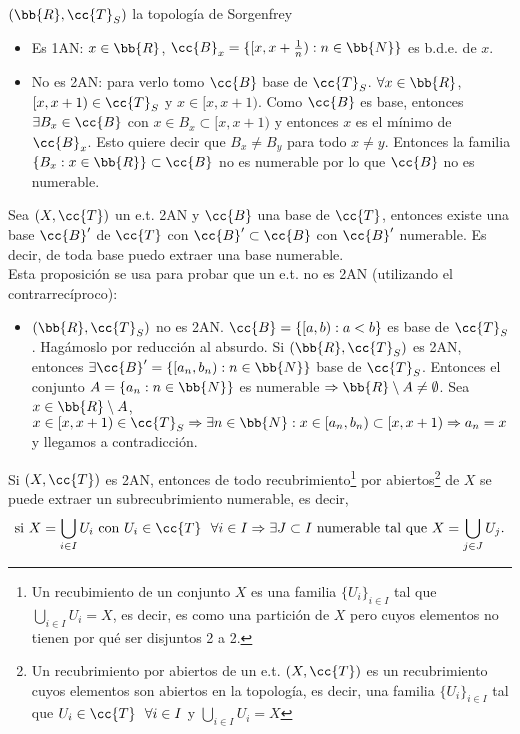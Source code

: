 \begin{ejemplo}
    $(\bb{R}, \cc{T}_S)$ la topología de Sorgenfrey
    \begin{itemize}
        \item Es 1AN: $x\in \bb{R}$, $\cc{B}_x = \{[x, x+\frac{1}{n}): n\in \bb{N}\}$ es b.d.e. de $x$.
        \item No es 2AN: para verlo tomo $\cc{B}$ base de $\cc{T}_S$. $\forall x \in \bb{R}$, $[x, x+1)\in \cc{T}_S$ y $x\in [x, x+1)$. Como $\cc{B}$ es base, entonces $\exists B_x \in \cc{B}$ con $x \in B_x \subset [x, x+1)$ y entonces $x$ es el mínimo de $\cc{B}_x$. Esto quiere decir que $B_x\neq B_y$ para todo $x\neq y$. Entonces la familia $\{B_x : x\in \bb{R}\}\subset \cc{B}$ no es numerable por lo que $\cc{B}$ no es numerable.
    \end{itemize}
\end{ejemplo}

\begin{prop}
    Sea $(X, \cc{T})$ un e.t. 2AN y $\cc{B}$ una base de $\cc{T}$, entonces existe una base $\cc{B}'$ de $\cc{T}$ con $\cc{B}'\subset \cc{B}$ con $\cc{B}'$ numerable. Es decir, de toda base puedo extraer una base numerable.\\

    Esta proposición se usa para probar que un e.t. no es 2AN (utilizando el contrarrecíproco):
    \begin{itemize}
        \item $(\bb{R}, \cc{T}_S)$ no es 2AN. $\cc{B}=\{[a,b):a<b\}$ es base de $\cc{T}_S$. Hagámoslo por reducción al absurdo. Si $(\bb{R}, \cc{T}_S)$ es 2AN, entonces $\exists \cc{B}'=\{[a_n, b_n): n \in \bb{N}\}$ base de $\cc{T}_S$. Entonces el conjunto $A=\{a_n : n\in \bb{N}\}$ es numerable $\Rightarrow \bb{R}\setminus A \neq \emptyset$. Sea $x \in \bb{R}\setminus A $, $x\in [x, x+1)\in \cc{T}_S \Rightarrow \exists n \in \bb{N}: x\in [a_n, b_n)\subset [x, x+1)\Rightarrow a_n=x$ y llegamos a contradicción.
    \end{itemize}
    \endsquare
\end{prop}

\begin{prop}
    Si $(X, \cc{T})$ es 2AN, entonces de todo recubrimiento\footnote{Un recubimiento de un conjunto $X$ es una familia $\{U_i\}_{i\in I}$ tal que $\bigcup\limits_{i\in I}U_i = X$, es decir, es como una partición de $X$ pero cuyos elementos no tienen por qué ser disjuntos 2 a 2.} por abiertos\footnote{Un recubrimiento por abiertos de un e.t. $(X, \cc{T})$ es un recubrimiento cuyos elementos son abiertos en la topología, es decir, una familia $\{U_i\}_{i\in I}$ tal que $U_i\in \cc{T}\ \ \forall i \in I$ y $\bigcup\limits_{i\in I}U_i = X$} de $X$ se puede extraer un subrecubrimiento numerable, es decir,
    \begin{gather*}
        \text{si } X=\bigcup\limits_{i\in I} U_i \text{ con } U_i \in \cc{T}\ \ \forall i \in I \Rightarrow \exists J\subset I \text{ numerable tal que } X=\bigcup\limits_{j\in J}U_j.
    \end{gather*}
    \endsquare
\end{prop}

